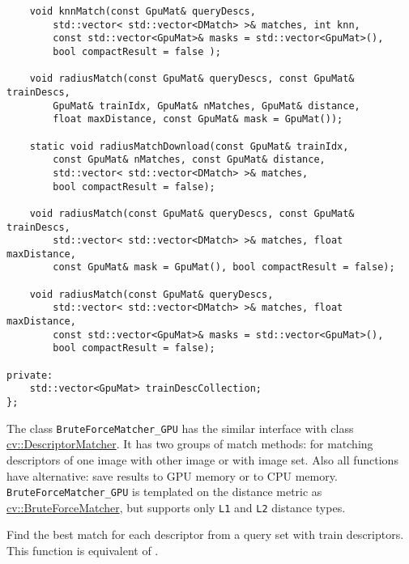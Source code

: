 \begin{lstlisting}
    void knnMatch(const GpuMat& queryDescs, 
        std::vector< std::vector<DMatch> >& matches, int knn,
        const std::vector<GpuMat>& masks = std::vector<GpuMat>(), 
        bool compactResult = false );

    void radiusMatch(const GpuMat& queryDescs, const GpuMat& trainDescs,
        GpuMat& trainIdx, GpuMat& nMatches, GpuMat& distance, 
        float maxDistance, const GpuMat& mask = GpuMat());

    static void radiusMatchDownload(const GpuMat& trainIdx, 
        const GpuMat& nMatches, const GpuMat& distance, 
        std::vector< std::vector<DMatch> >& matches, 
        bool compactResult = false);

    void radiusMatch(const GpuMat& queryDescs, const GpuMat& trainDescs,
        std::vector< std::vector<DMatch> >& matches, float maxDistance,
        const GpuMat& mask = GpuMat(), bool compactResult = false);

    void radiusMatch(const GpuMat& queryDescs, 
        std::vector< std::vector<DMatch> >& matches, float maxDistance,
        const std::vector<GpuMat>& masks = std::vector<GpuMat>(), 
        bool compactResult = false);

private:
    std::vector<GpuMat> trainDescCollection;
};
\end{lstlisting}

The class \texttt{BruteForceMatcher\_GPU} has the similar interface with class \hyperref[cv.class.DescriptorMatcher]{cv::DescriptorMatcher}. It has two groups of match methods: for matching descriptors of one image with other image or with image set. Also all functions have alternative: save results to GPU memory or to CPU memory. \texttt{BruteForceMatcher\_GPU} is templated on the distance metric as \hyperref[cv.class.BruteForceMatcher]{cv::BruteForceMatcher}, but supports only \texttt{L1} and \texttt{L2} distance types.

\label{cppfunc.gpu.BruteForceMatcher.match}
Find the best match for each descriptor from a query set with train descriptors. This function is equivalent of .

